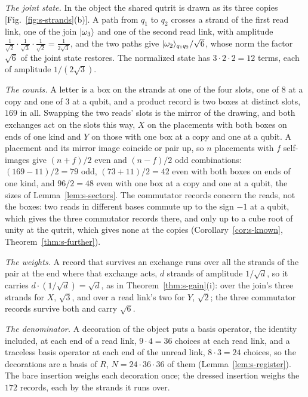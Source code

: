 \emph{The joint state.} In the object the shared qutrit is drawn as its three copies [Fig.~\ref{fig:s-strands}(b)]. A path from $q_{1}$ to $q_{2}$ crosses a strand of the first read link, one of the join $|\omega_{3}\rangle$ and one of the second read link, with amplitude $\tfrac{1}{\sqrt{2}}\cdot\tfrac{1}{\sqrt{3}}\cdot\tfrac{1}{\sqrt{2}}=\tfrac{1}{2\sqrt{3}}$, and the two paths give $|\omega_{2}\rangle_{q_{1}q_{2}}/\sqrt{6}$, whose norm the factor $\sqrt{6}$ of the joint state restores. The normalized state has $3\cdot 2\cdot 2=12$ terms, each of amplitude $1/(2\sqrt{3})$.

\emph{The counts.} A letter is a box on the strands at one of the four slots, one of $8$ at a copy and one of $3$ at a qubit, and a product record is two boxes at distinct slots, $169$ in all. Swapping the two reads' slots is the mirror of the drawing, and both exchanges act on the slots this way, $X$ on the placements with both boxes on ends of one kind and $Y$ on those with one box at a copy and one at a qubit. A placement and its mirror image coincide or pair up, so $n$ placements with $f$ self-images give $(n+f)/2$ even and $(n-f)/2$ odd combinations: $(169-11)/2=79$ odd, $(73+11)/2=42$ even with both boxes on ends of one kind, and $96/2=48$ even with one box at a copy and one at a qubit, the sizes of Lemma~\ref{lem:s-sectors}. The commutator records concern the reads, not the boxes: two reads in different bases commute up to the sign $-1$ at a qubit, which gives the three commutator records there, and only up to a cube root of unity at the qutrit, which gives none at the copies (Corollary~\ref{cor:s-known}, Theorem~\ref{thm:s-further}).

\emph{The weights.} A record that survives an exchange runs over all the strands of the pair at the end where that exchange acts, $d$ strands of amplitude $1/\sqrt{d}$, so it carries $d\cdot(1/\sqrt{d})=\sqrt{d}$, as in Theorem~\ref{thm:s-gain}(i): over the join's three strands for $X$, $\sqrt{3}$, and over a read link's two for $Y$, $\sqrt{2}$; the three commutator records survive both and carry $\sqrt{6}$.

\emph{The denominator.} A decoration of the object puts a basis operator, the identity included, at each end of a read link, $9\cdot 4=36$ choices at each read link, and a traceless basis operator at each end of the unread link, $8\cdot 3=24$ choices, so the decorations are a basis of $R$, $N=24\cdot 36\cdot 36$ of them (Lemma~\ref{lem:s-register}). The bare insertion weighs each decoration once; the dressed insertion weighs the $172$ records, each by the strands it runs over.

